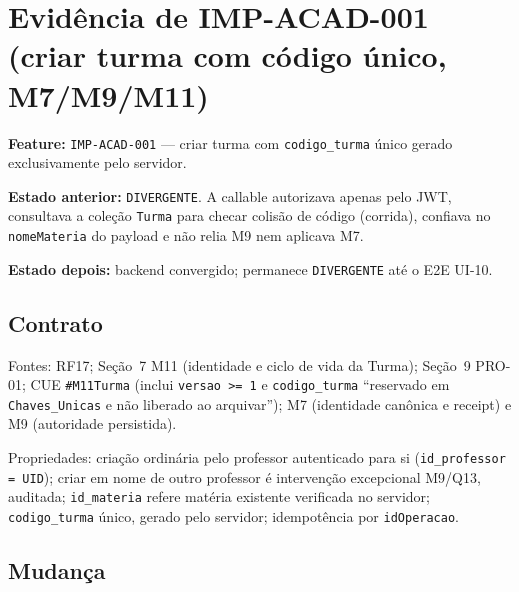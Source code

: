 \section{Evidência de IMP-ACAD-001 (criar turma com código único, M7/M9/M11)}

\textbf{Feature:} \texttt{IMP-ACAD-001} --- criar turma com \texttt{codigo\_turma}
único gerado exclusivamente pelo servidor.

\textbf{Estado anterior:} \texttt{DIVERGENTE}. A callable autorizava apenas pelo
JWT, consultava a coleção \texttt{Turma} para checar colisão de código (corrida),
confiava no \texttt{nomeMateria} do payload e não relia M9 nem aplicava M7.

\textbf{Estado depois:} backend convergido; permanece \texttt{DIVERGENTE} até o
E2E UI-10.

\subsection{Contrato}

Fontes: RF17; Seção~7 M11 (identidade e ciclo de vida da Turma); Seção~9
PRO-01; CUE \texttt{\#M11Turma} (inclui \texttt{versao >= 1} e
\texttt{codigo\_turma} ``reservado em \texttt{Chaves\_Unicas} e não liberado ao
arquivar''); M7 (identidade canônica e receipt) e M9 (autoridade persistida).

Propriedades: criação ordinária pelo professor autenticado para si
(\texttt{id\_professor = UID}); criar em nome de outro professor é intervenção
excepcional M9/Q13, auditada; \texttt{id\_materia} refere matéria existente
verificada no servidor; \texttt{codigo\_turma} único, gerado pelo servidor;
idempotência por \texttt{idOperacao}.

\subsection{Mudança}

